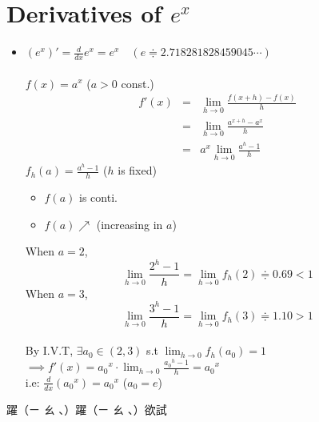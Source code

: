 \section{Derivatives of $e^x$}
\begin{itemize}
\item $\displaystyle (e^x)' = \frac{d}{dx} e^x = e^x \quad (e \Doteq 2.718281828459045 \cdots)$\\\\
$f(x) = a^x$ \quad ($a >0$ const.)
$$\begin{array}{rcl}
\displaystyle f'(x) & = & \displaystyle \lim_{h \to 0} \frac{f(x +h) -f(x)}{h}\\
& = & \displaystyle \lim_{h \to 0} \frac{a^{x+h} - a^x}{h}\\
& = & \displaystyle a^x \lim_{h \to 0} \frac{a^h - 1}{h}
\end{array}$$
$\displaystyle f_h(a) = \frac{a^h - 1}{h}$ \quad ($h$ is fixed)
\begin{itemize}
\item $f(a)$ is conti.
\item $f(a) \nearrow$ \quad (increasing in $a$)
\end{itemize}
When $ a = 2$,
$$\displaystyle \lim_{h \to 0} \frac{2^h -1}{h} = \lim_{h \to 0} f_h(2) \Doteq 0.69 < 1$$
When $a = 3$,
$$\displaystyle \lim_{h \to 0} \frac{3^h -1}{h} = \lim_{h \to 0} f_h(3) \Doteq 1.10 > 1$$\\
By I.V.T, $\displaystyle \exists a_0 \in (2, 3)$ s.t $\displaystyle \lim_{h \to 0} f_h(a_0) = 1$\\
$\displaystyle \implies f'(x) = {a_0}^x \cdot \lim_{h \to 0} \frac{{a_0}^h - 1}{h} = {a_0}^x$\\
i.e: $\displaystyle \frac{d}{dx}({a_0}^x) = {a_0}^x$ \quad (${a_0} = e$)
\end{itemize}

\begin{jk}{}
躍（ㄧ ㄠ 、）躍（ㄧ ㄠ 、）欲試
\end{jk}
